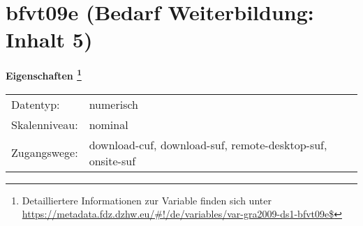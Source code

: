 
    \setcounter{footnote}{0}

    \vspace*{-1.8cm}
	\section{bfvt09e (Bedarf Weiterbildung: Inhalt 5)}
	\label{section:bfvt09e}



    \vspace*{0.5cm}
    \noindent\textbf{Eigenschaften
	\footnote{Detailliertere Informationen zur Variable finden sich unter
		\url{https://metadata.fdz.dzhw.eu/\#!/de/variables/var-gra2009-ds1-bfvt09e$}}}\\
	\begin{tabularx}{\hsize}{@{}lX}
	Datentyp: & numerisch \\
	Skalenniveau: & nominal \\
	Zugangswege: &
	  download-cuf, 
	  download-suf, 
	  remote-desktop-suf, 
	  onsite-suf
 \\
    \end{tabularx}



